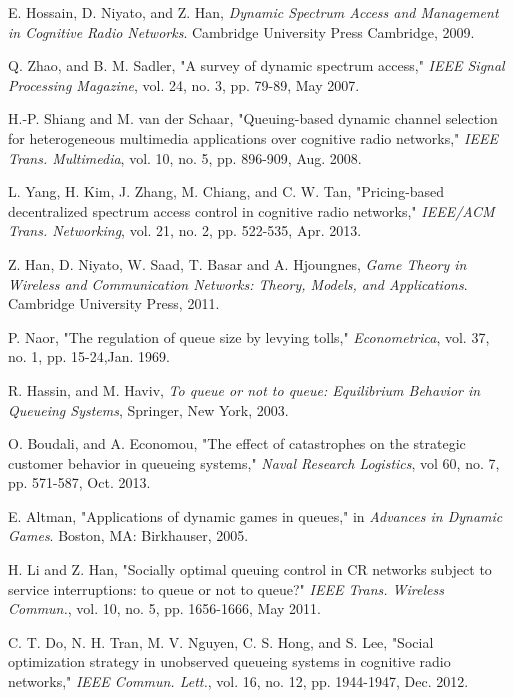 \documentclass[journal]{IEEEtran}
\begin{document}
\begin{thebibliography}{1}

E. Hossain, D. Niyato, and Z. Han, \emph{Dynamic Spectrum Access and
Management in Cognitive Radio Networks}. Cambridge University Press
Cambridge, 2009.

Q. Zhao, and B. M. Sadler, "A survey of dynamic spectrum access,"
\emph{IEEE Signal Processing Magazine}, vol. 24, no. 3, pp. 79-89, May
2007.

H.-P. Shiang and M. van der Schaar, "Queuing-based dynamic channel
selection for heterogeneous multimedia applications over cognitive
radio networks," \emph{IEEE Trans. Multimedia}, vol. 10, no. 5,
pp. 896-909, Aug. 2008.

L. Yang, H. Kim, J. Zhang, M. Chiang, and C. W. Tan,
"Pricing-based decentralized spectrum access control in cognitive
radio networks," \emph{IEEE/ACM Trans. Networking}, vol.
21, no. 2, pp. 522-535, Apr. 2013.

Z. Han, D. Niyato, W. Saad, T. Basar and A. Hjoungnes, \emph{Game Theory in
Wireless and Communication Networks: Theory, Models, and
Applications}. Cambridge University Press, 2011.

P. Naor, "The regulation of queue size by levying tolls,"
\emph{Econometrica}, vol. 37, no. 1, pp. 15-24,Jan. 1969.

R. Hassin, and M. Haviv, \emph{To queue or not to queue: Equilibrium
Behavior in Queueing Systems}, Springer, New York, 2003.

O. Boudali, and A. Economou, "The effect of catastrophes on the
strategic customer behavior in queueing systems," \emph{Naval
Research Logistics}, vol 60, no. 7, pp. 571-587, Oct. 2013.


E. Altman, "Applications of dynamic games in queues," in
\emph{Advances in Dynamic Games}. Boston, MA: Birkhauser, 2005.


H. Li and Z. Han, "Socially optimal queuing control in CR networks
subject to service interruptions: to queue or not to queue?"
\emph{IEEE Trans. Wireless Commun.}, vol. 10, no. 5, pp. 1656-1666, May 2011.

C. T. Do, N. H. Tran, M. V. Nguyen, C. S. Hong, and S. Lee,
"Social optimization strategy in unobserved queueing systems in
cognitive radio networks," \emph{IEEE Commun. Lett.}, vol. 16, no.
12, pp. 1944-1947, Dec. 2012.


\end{thebibliography}
\end{document}
